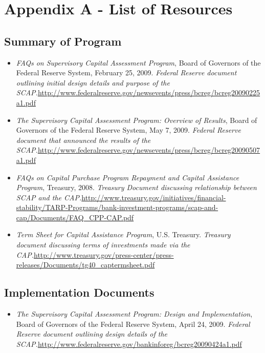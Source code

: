 \documentclass[justified, nobib]{tufte-handout2}
\begin{document}
\nocite{*}


\section{Appendix A - List of Resources}

\subsection{Summary of Program}

\begin{itemize}
\item
\emph{FAQs
  on Supervisory Capital Assessment Program}, Board of Governors of the
  Federal Reserve System, February 25, 2009. \emph{Federal Reserve
  document outlining initial design details and purpose of the SCAP.}\url{http://www.federalreserve.gov/newsevents/press/bcreg/bcreg20090225a1.pdf}
\item
   \emph{The Supervisory Capital Assessment Program: Overview of Results}, Board
  of Governors of the Federal Reserve System, May 7, 2009. \emph{Federal
  Reserve document that announced the results of the SCAP.}\url{http://www.federalreserve.gov/newsevents/press/bcreg/bcreg20090507a1.pdf}
\item
\emph{FAQs
  on Capital Purchase Program Repayment and Capital Assistance
  Program}, Treasury, 2008. \emph{Treasury Document discussing
  relationship between SCAP and the CAP.}\url{http://www.treasury.gov/initiatives/financial-stability/TARP-Programs/bank-investment-programs/scap-and-cap/Documents/FAQ_CPP-CAP.pdf}
\item
\emph{Term
  Sheet for Capital Assistance Program}, U.S. Treasury. \emph{Treasury
  document discussing terms of investments made via the CAP.}\url{http://www.treasury.gov/press-center/press-releases/Documents/tg40_captermsheet.pdf}
\end{itemize}

\subsection{Implementation Documents}
\begin{itemize}
\item
\emph{The
  Supervisory Capital Assessment Program: Design and Implementation},
  Board of Governors of the Federal Reserve System, April 24, 2009.
  \emph{Federal Reserve document outlining design details of the SCAP.}\url{http://www.federalreserve.gov/bankinforeg/bcreg20090424a1.pdf}
\end{itemize}
\end{document}

